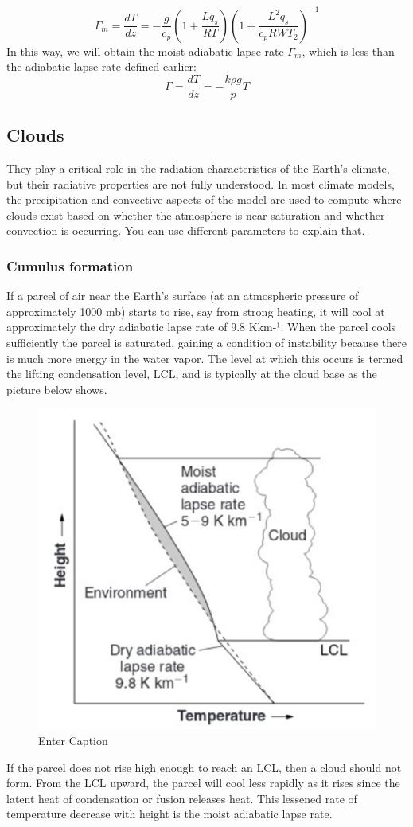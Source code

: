 \begin{equation}\label{eq.adiabatic lapse rate}
	\Gamma_m= \frac{dT}{dz} = -\frac{g}{c_p} \left( 1 + \frac{L q_s}{R T} \right) \left( 1 + \frac{L^2 q_s}{c_p R W T_2} \right)^{-1}
\end{equation}
In this way, we will obtain the moist adiabatic lapse rate $\Gamma_m$, which is less than the adiabatic lapse rate defined earlier: $$\Gamma=\frac{dT}{dz}=-\frac{k\rho g}{p}T$$



\subsection{Clouds}
They play a critical role in the radiation characteristics of the Earth's climate, but their radiative properties are not fully understood. In most climate models, the precipitation and convective aspects of the model are used to compute where clouds exist based on whether the atmosphere is near saturation and whether convection is occurring. You can use different parameters to explain that.

\subsubsection{Cumulus formation}
If a parcel of air near the Earth's surface (at an atmospheric pressure of approximately 1000 mb) starts to rise, say from strong heating, it will cool at approximately the dry adiabatic lapse rate of 9.8 Kkm-¹. When the parcel cools sufficiently the parcel is saturated, gaining a condition of instability because there is much more energy in the water vapor. The level at which this occurs is termed the lifting condensation level, LCL, and is typically at the cloud base as the picture below shows.
\begin{figure}[htpb]
	\centering
	\includegraphics[width=0.4\linewidth]{uploads/image14.png}
	\caption{Enter Caption}
	\label{fig:enter-label}
\end{figure}
If the parcel does not rise high enough to reach an LCL, then a cloud should not form. From the LCL upward, the parcel will cool less rapidly as it rises since the latent heat of condensation or fusion releases heat. This lessened rate of temperature decrease with height is the moist adiabatic lapse rate.

